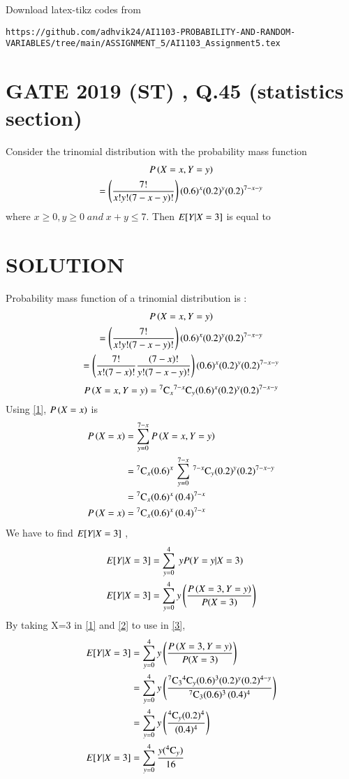 \documentclass[journal,12pt,twocolumn]{IEEEtran}
\begin{document}
%
Download latex-tikz codes from 
%
\begin{lstlisting}
https://github.com/adhvik24/AI1103-PROBABILITY-AND-RANDOM-VARIABLES/tree/main/ASSIGNMENT_5/AI1103_Assignment5.tex
\end{lstlisting}
\section{GATE 2019 (ST) , Q.45 (statistics section)}
Consider the trinomial distribution with the probability mass function 
\begin{multline}
    \nonumber P\left(X={x} , Y={y}\right)\\=\left(\frac{7!}{x!y!(7-x-y)!}\right)(0.6)^x(0.2)^y(0.2)^{7-x-y}
\end{multline}
where $x\geq0 , y\geq0 \;and\; {x+y}\leq7$.
Then $E[ Y|X=3 ]$ is equal to
\section{SOLUTION}
Probability mass function of a trinomial  distribution is :
\begin{multline}
   P\left(X={x} , Y={y}\right) \\=\left(\frac{7!}{x!y!(7-x-y)!}\right)(0.6)^x(0.2)^y(0.2)^{7-x-y}\\
  \nonumber  =\left(\frac{7!}{x!(7-x)!}\frac{(7-x)!}{y!(7-x-y)!}\right)(0.6)^x(0.2)^y(0.2)^{7-x-y}
\end{multline}
\begin{equation}
    P\left(X={x} , Y={y}\right)={}^{7}\mathrm{C}_{x}{}^{7-x}\mathrm{C}_{y}(0.6)^x(0.2)^y(0.2)^{7-x-y}\label{1}
\end{equation}
Using \eqref{1}, $P\left(X={x}\right)$ is 
\begin{align}
   \nonumber P\left(X={x}\right)&=\sum_{y=0}^{7-x} P\left(X={x} , Y={y}\right)\\
  \nonumber &={}^{7}\mathrm{C}_{x}(0.6)^x\,\sum_{y=0}^{7-x}\, {}^{7-x}\mathrm{C}_{y} (0.2)^y(0.2)^{7-x-y} \\
  \nonumber  &={}^{7}\mathrm{C}_{x}(0.6)^x\,{(0.4)^{7-x}}\\
    P\left(X={x}\right)&={}^{7}\mathrm{C}_{x}(0.6)^x\,{(0.4)^{7-x}}\label{2}
\end{align}
We have to find $E[ Y|X=3 ]$ ,
\begin{align}
    E[ Y|X=3 ]&=\sum_{y=0}^4 \: y P(Y=y|X=3)\\
    E[ Y|X=3 ]&=\sum_{y=0}^4 y \left(  \frac{ P\left(X={3} , Y={y}\right)}{P(X=3)} \right)\label{3}
\end{align}
By taking X=3 in \eqref{1} and \eqref{2}  to use in \eqref{3},
\begin{align}
   \nonumber E[ Y|X=3 ]&=\sum_{y=0}^4 y \left( \frac{ P\left(X={3} , Y={y}\right)}{P(X=3)}\right)\\
  \nonumber  &=\sum_{y=0}^4 y   \left(\frac{{}^{7}\mathrm{C}_{3}{}^{4}\mathrm{C}_{y}(0.6)^3(0.2)^y(0.2)^{4-y}}{{}^{7}\mathrm{C}_{3}(0.6)^3\,{(0.4)^{4}}}\right)\\
 \nonumber &=\sum_{y=0}^4 y   \left(\frac{{}^{4}\mathrm{C}_{y}(0.2)^{4}}{{(0.4)^{4}}}\right)\\
 E[ Y|X=3 ]&=\sum_{y=0}^4 {\frac{y({}^{4}\mathrm{C}_{y})}{{16}}}\label{4}
 \end{align}
\end{document}

